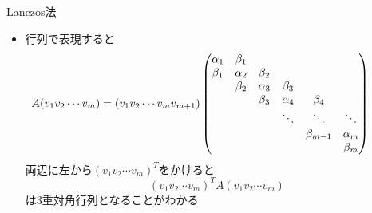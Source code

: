 \begin{frame}[t,fragile]{Lanczos法}
  \begin{itemize}
    \setlength{\itemsep}{1em}
  \item 行列で表現すると
    \begin{align*}
      \hspace*{-2em}
      A
      (v_1v_2\cdots v_m)
      &=
      (v_1v_2\cdots v_m v_{m+1})
      \begin{pmatrix}
        \alpha_1 & \beta_1\\
        \beta_1 & \alpha_2 & \beta_2 \\
        & \beta_2 & \alpha_3 & \beta_3 \\
        & & \beta_3 & \alpha_4 & \beta_4 \\
        & & & \ddots & \ddots & \ddots \\
        & & & & \beta_{m-1} & \alpha_m \\
        & & & & & \beta_m \\
      \end{pmatrix}
    \end{align*}
    両辺に左から$(v_1v_2\cdots v_m)^T$をかけると
    \[
    (v_1v_2\cdots v_m)^T A (v_1v_2\cdots v_m)
    \]
    は3重対角行列となることがわかる
  \end{itemize}
\end{frame}
